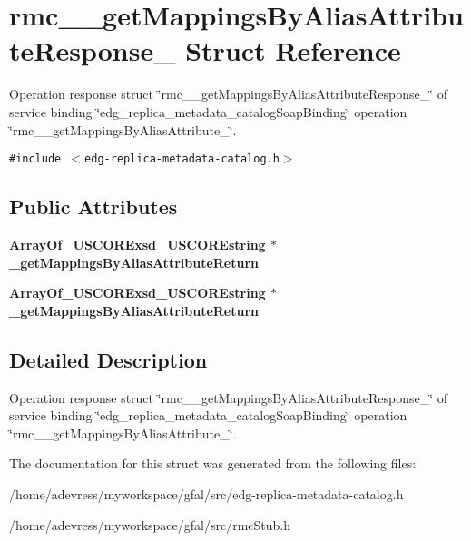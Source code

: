 \section{rmc\_\-\_\-get\-Mappings\-By\-Alias\-Attribute\-Response\_\- Struct Reference}
\label{structrmc____getMappingsByAliasAttributeResponse__}
Operation response struct \char`\"{}rmc\_\-\_\-get\-Mappings\-By\-Alias\-Attribute\-Response\_\-\char`\"{} of service binding \char`\"{}edg\_\-replica\_\-metadata\_\-catalog\-Soap\-Binding\char`\"{} operation \char`\"{}rmc\_\-\_\-get\-Mappings\-By\-Alias\-Attribute\_\-\char`\"{}.  


{\tt \#include $<$edg-replica-metadata-catalog.h$>$}

\subsection*{Public Attributes}
\begin{CompactItemize}
\item 
\bf{Array\-Of\_\-USCORExsd\_\-USCOREstring} $\ast$ \textbf{\_\-get\-Mappings\-By\-Alias\-Attribute\-Return}\label{structrmc____getMappingsByAliasAttributeResponse___477819836199cc0fc12ca1f971351618}

\item 
\bf{Array\-Of\_\-USCORExsd\_\-USCOREstring} $\ast$ \textbf{\_\-get\-Mappings\-By\-Alias\-Attribute\-Return}\label{structrmc____getMappingsByAliasAttributeResponse___477819836199cc0fc12ca1f971351618}

\end{CompactItemize}


\subsection{Detailed Description}
Operation response struct \char`\"{}rmc\_\-\_\-get\-Mappings\-By\-Alias\-Attribute\-Response\_\-\char`\"{} of service binding \char`\"{}edg\_\-replica\_\-metadata\_\-catalog\-Soap\-Binding\char`\"{} operation \char`\"{}rmc\_\-\_\-get\-Mappings\-By\-Alias\-Attribute\_\-\char`\"{}. 



The documentation for this struct was generated from the following files:\begin{CompactItemize}
\item 
/home/adevress/myworkspace/gfal/src/edg-replica-metadata-catalog.h\item 
/home/adevress/myworkspace/gfal/src/rmc\-Stub.h\end{CompactItemize}

